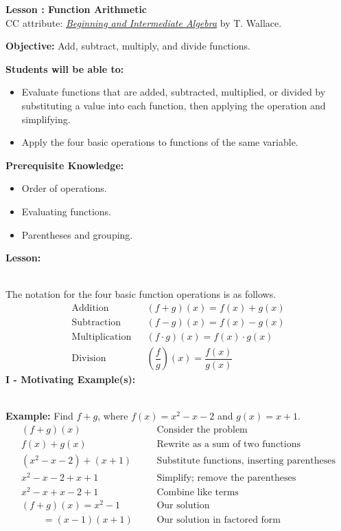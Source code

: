 \documentclass[12pt]{article}
\theoremstyle{definition}
\begin{document}
{\bf \large Lesson : Function Arithmetic}
\\ CC attribute: \href{http://www.wallace.ccfaculty.org/book/book.html}{\it{Beginning and Intermediate Algebra}} by T. Wallace. 
\hfill \doclicenseImage[imagewidth=5em]\\
\par
{\bf Objective:} Add, subtract, multiply, and divide functions.\\
\par
{\bf Students will be able to:}
\begin{itemize}
	\item Evaluate functions that are added, subtracted, multiplied, or divided by substituting a value into each function, then applying the operation and simplifying.
	\item Apply the four basic operations to functions of the same variable.
\end{itemize}
{\bf Prerequisite Knowledge:}
\begin{itemize}
	\item Order of operations.
	\item Evaluating functions.
	\item Parentheses and grouping.
\end{itemize}
\hrulefill

{\bf Lesson:}\\
\ \par
The notation for the four basic function operations is as follows. 
\begin{eqnarray*}
  \text{Addition} &  & (f + g) (x) = f (x) + g (x)\\
	\text{Subtraction} &  & (f - g) (x) = f (x) - g (x)\\  
	\text{Multiplication} &  & (f \cdot g) (x) = f (x)\cdot g (x)\\
	\text{Division} &  & \left(\dfrac{f}{g}\right) (x) = \dfrac{f (x)}{g (x)}
\end{eqnarray*}
{\bf I - Motivating Example(s):}\\
\ \par
{\bf Example:} Find $f+g$, where $f (x) = x^2 - x - 2$ and $g(x) = x + 1$.
  \begin{eqnarray*}
    (f + g)(x)~~~~~~~~~~ &  & \text{Consider the problem} \\
		f(x) + g(x)~~~~~~~~~ &  & \text{Rewrite as a sum of two functions}\\
		(x^2 - x - 2) + (x + 1) &  & \text{Substitute functions, inserting parentheses}\\
		x^2 - x - 2 + x + 1~~ &  & \text{Simplify; remove the parentheses}\\
		x^2 - x + x -2 + 1~~ &  & \text{Combine like terms}\\
    (f + g)(x)=x^2 - 1~~~~~~~~~~ &  & \text{Our solution}\\
    ~~~~~~~~~~=(x-1)(x+1) &  & \text{Our solution in factored form}
  \end{eqnarray*}
	
\end{document}
